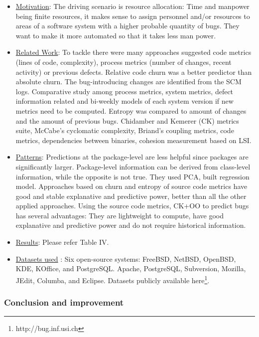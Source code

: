 \documentclass[conference]{IEEEtran}
\begin{document}
\begin{itemize}
    \item \underline{Motivation}: The driving scenario is resource allocation: Time and manpower being finite resources, it makes sense to assign personnel and/or resources to areas of a software system with a higher probable quantity of bugs. They want to make it more automated so that it takes less man power.
    \item \underline{Related Work}: To tackle there were many approaches suggested code metrics (lines of code, complexity), process metrics (number of changes, recent activity) or previous defects. Relative code churn was a better predictor than absolute churn. The bug-introducing changes are identified from the SCM logs.  Comparative study among process metrics, system metrics, defect information related and bi-weekly models of each system version if new metrics need to be computed. Entropy was compared to amount of changes and the amount of previous bugs. Chidamber and Kemerer (CK) metrics suite, McCabe’s cyclomatic complexity, Briand’s coupling metrics, code metrics, dependencies between binaries, cohesion measurement based on LSI.
    \item \underline{Patterns}: Predictions at the package-level are less helpful since packages are significantly larger. Package-level information can be derived from class-level information, while the opposite is not true. They used PCA, built regression model. Approaches based on churn and entropy of source code metrics have good and stable explanative and predictive power, better than all the other applied approaches. Using the source code metrics, CK+OO to predict bugs has several advantages: They are lightweight to compute, have good explanative and predictive power and do not require historical information.
    \item \underline{Results}: Please refer Table IV.
    \item \underline{Datasets used} : Six open-source systems: FreeBSD, NetBSD, OpenBSD, KDE, KOffice, and PostgreSQL. Apache, PostgreSQL, Subversion, Mozilla, JEdit, Columba, and Eclipse. Datasets publicly available here\footnote{http://bug.inf.usi.ch}.
\end{itemize}

\subsubsection{\textbf{Conclusion and improvement}}
\end{document}
